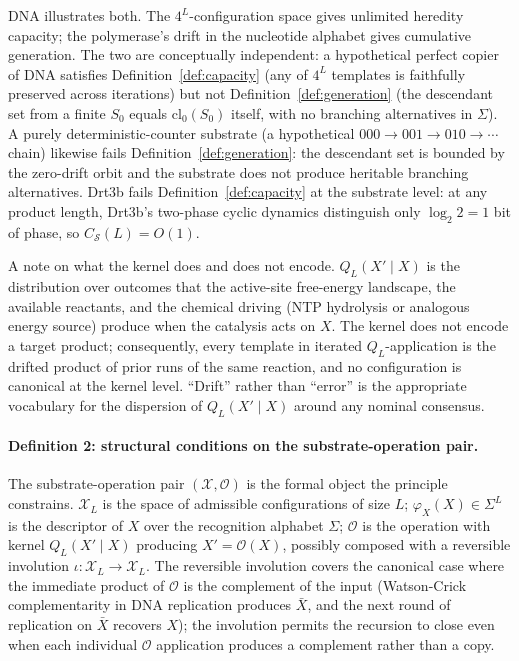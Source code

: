 \documentclass[aps,prx,reprint,amsmath,amssymb,floatfix,superscriptaddress,nofootinbib]{revtex4-2}
\theoremstyle{plain-thm}
\theoremstyle{definition-thm}
\newcommand{\Csub}{C_{\mathcal{S}}}
\newcommand{\descX}{\varphi_X}
\newcommand{\Xset}{\mathcal{X}}
\newcommand{\Op}{\mathcal{O}}
\begin{document}
DNA illustrates both. The $4^L$-configuration space gives unlimited heredity capacity; the polymerase's drift in the nucleotide alphabet gives cumulative generation. The two are conceptually independent: a hypothetical perfect copier of DNA satisfies Definition~\ref{def:capacity} (any of $4^L$ templates is faithfully preserved across iterations) but not Definition~\ref{def:generation} (the descendant set from a finite $S_0$ equals $\mathrm{cl}_0(S_0)$ itself, with no branching alternatives in $\Sigma$). A purely deterministic-counter substrate (a hypothetical $000 \to 001 \to 010 \to \cdots$ chain) likewise fails Definition~\ref{def:generation}: the descendant set is bounded by the zero-drift orbit and the substrate does not produce heritable branching alternatives. Drt3b fails Definition~\ref{def:capacity} at the substrate level: at any product length, Drt3b's two-phase cyclic dynamics distinguish only $\log_2 2 = 1$ bit of phase, so $\Csub(L) = O(1)$.

A note on what the kernel does and does not encode. $Q_L(X' \mid X)$ is the distribution over outcomes that the active-site free-energy landscape, the available reactants, and the chemical driving (NTP hydrolysis or analogous energy source) produce when the catalysis acts on $X$. The kernel does not encode a target product; consequently, every template in iterated $Q_L$-application is the drifted product of prior runs of the same reaction, and no configuration is canonical at the kernel level. ``Drift'' rather than ``error'' is the appropriate vocabulary for the dispersion of $Q_L(X' \mid X)$ around any nominal consensus.

\paragraph{Definition 2: structural conditions on the substrate-operation pair.}

The substrate-operation pair $(\Xset, \Op)$ is the formal object the principle constrains. $\Xset_L$ is the space of admissible configurations of size $L$; $\descX(X) \in \Sigma^L$ is the descriptor of $X$ over the recognition alphabet $\Sigma$; $\Op$ is the operation with kernel $Q_L(X' \mid X)$ producing $X' = \Op(X)$, possibly composed with a reversible involution $\iota: \Xset_L \to \Xset_L$. The reversible involution covers the canonical case where the immediate product of $\Op$ is the complement of the input (Watson-Crick complementarity in DNA replication produces $\bar{X}$, and the next round of replication on $\bar{X}$ recovers $X$); the involution permits the recursion to close even when each individual $\Op$ application produces a complement rather than a copy.
\end{document}
